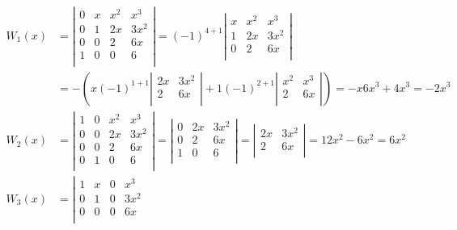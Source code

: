\begin{align*}
  W_1(x) &= \left| \begin{array}{cccc}
  0 & x & x^2 & x^3\\
  0 & 1 & 2x & 3x^2\\
  0 & 0 & 2 & 6x\\
  1 & 0 & 0 & 6\\
  \end{array} \right| =  (-1)^{4+1} \left| \begin{array}{ccc}
  x & x^2 & x^3\\
  1 & 2x & 3x^2\\
  0 & 2 & 6x\\
  \end{array} \right| \\
         &= -\left( x (-1)^{1+1} \left| \begin{array}{cc}
  2x & 3x^2\\
  2 & 6x\\
  \end{array} \right| + 1 (-1)^{2+1} \left| \begin{array}{cc}
  x^2 & x^3\\
  2 & 6x\\
  \end{array} \right| \right) = -x 6x^3 + 4x^3 = -2x^3 \\
  W_2(x) &= \left| \begin{array}{cccc}
  1 & 0 & x^2 & x^3\\
  0 & 0 & 2x & 3x^2\\
  0 & 0 & 2 & 6x\\
  0 & 1 & 0 & 6\\
  \end{array} \right| = \left| \begin{array}{ccc}
  0 & 2x & 3x^2\\
  0 & 2 & 6x\\
  1 & 0 & 6\\
  \end{array} \right| = \left| \begin{array}{cc}
  2x & 3x^2\\
  2 & 6x\\
  \end{array} \right| = 12x^2 - 6x^2 = 6x^2 \\
  W_3(x) &= \left| \begin{array}{cccc}
  1 & x & 0 & x^3\\
  0 & 1 & 0 & 3x^2\\
  0 & 0 & 0 & 6x\\

\end{array}
\end{align*}
